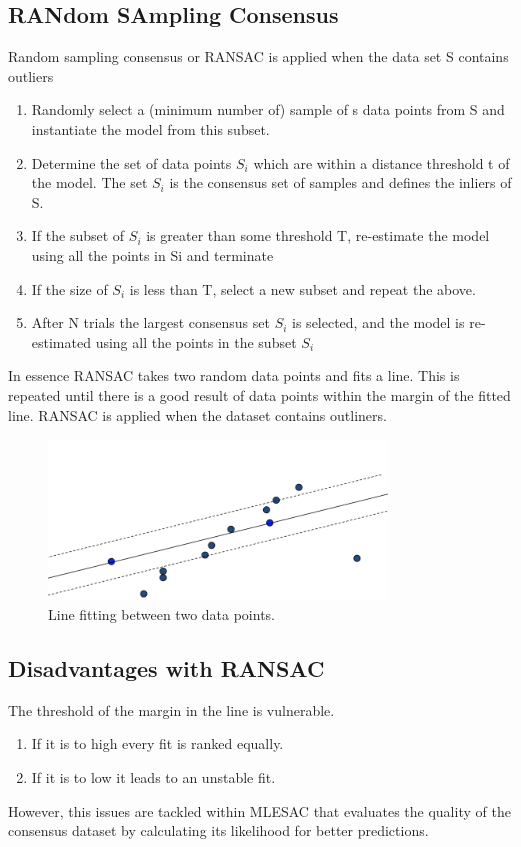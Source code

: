 \documentclass[12pt]{article}
\numberwithin{equation}{section}
\begin{document}
\subsection{RANdom SAmpling Consensus}
Random sampling consensus or RANSAC is applied when the data set S contains outliers
\begin{enumerate}
    \item Randomly select a (minimum number of) sample of s data
    points from S and instantiate the model from this subset.
    \item Determine the set of data points $S_i$ which are within a distance threshold t of the model. The set $S_i$ is the consensus set of samples and defines the inliers of S.
    \item If the subset of $S_i$ is greater than some threshold T, re-estimate the model using all the points in Si and terminate
    \item If the size of $S_i$ is less than T, select a new subset and repeat the above.
    \item After N trials the largest consensus set $S_i$ is selected, and the model is re-estimated using all the points in the subset $S_i$
\end{enumerate}
In essence RANSAC takes two random data points and fits a line. This is repeated until there is a good result of data points within the margin of the fitted line. RANSAC is applied when the dataset contains outliners.
\begin{figure}[!ht]
    \centering
    \includegraphics[width =9cm]{RANSAC.png}
    \caption{Line fitting between two data points.}
    \label{RANSAC}
\end{figure}

\subsection{Disadvantages with RANSAC}
The threshold of the margin in the line is vulnerable.
\begin{enumerate}
\item  If it is to high every fit is ranked equally. 
\item If it is to low it leads to an unstable fit.
\end{enumerate}
However, this issues are tackled within MLESAC that evaluates the quality of the consensus dataset by calculating its likelihood for better predictions.
\end{document}
